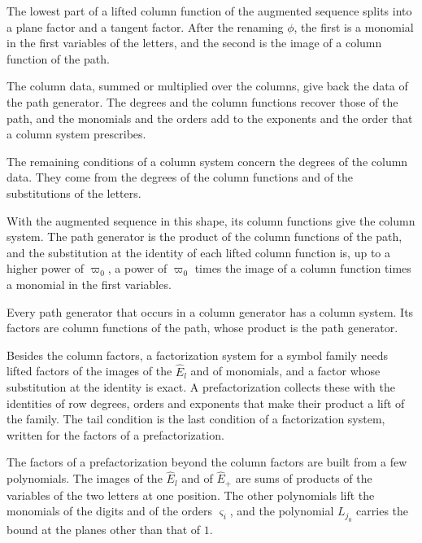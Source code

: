 The lowest part of a lifted column function of the augmented sequence splits into a plane factor and a tangent factor. After the
renaming $\phi$, the first is a monomial in the first variables of the letters, and the second is the image of a column function
of the path.

The column data, summed or multiplied over the columns, give back the data of the path generator. The degrees and the column
functions recover those of the path, and the monomials and the orders add to the exponents and the order that a column system
prescribes.

The remaining conditions of a column system concern the degrees of the column data. They come from the degrees of the column
functions and of the substitutions of the letters.

With the augmented sequence in this shape, its column functions give the column system. The path generator is the product of
the column functions of the path, and the substitution at the identity of each lifted column function is, up to a higher power
of $\varpi_0$, a power of $\varpi_0$ times the image of a column function times a monomial in the first variables.

Every path generator that occurs in a column generator has a column system. Its factors are column functions of the path, whose
product is the path generator.

Besides the column factors, a factorization system for a symbol family needs lifted factors of the images of the $\hat E_l$ and
of monomials, and a factor whose substitution at the identity is exact. A prefactorization collects these with the identities of
row degrees, orders and exponents that make their product a lift of the family. The tail condition is the last condition of a
factorization system, written for the factors of a prefactorization.

The factors of a prefactorization beyond the column factors are built from a few polynomials. The images of the $\hat E_l$
and of $\hat E_+$ are sums of products of the variables of the two letters at one position. The other polynomials lift the
monomials of the digits and of the orders $\varsigma_i$, and the polynomial $L_{j_0}$ carries the bound at the planes other
than that of $1$.


